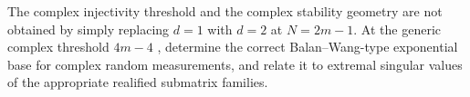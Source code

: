 \begin{problem}
The complex injectivity threshold and the complex stability geometry are not
obtained by simply replacing \(d=1\) with \(d=2\) at \(N=2m-1\).  At the generic
complex threshold \(4m-4\) \cite{ConcaEdidinHeringVinzant2015}, determine the
correct Balan--Wang-type exponential base for complex random measurements, and
relate it to extremal singular values of the appropriate realified submatrix
families.
\end{problem}
